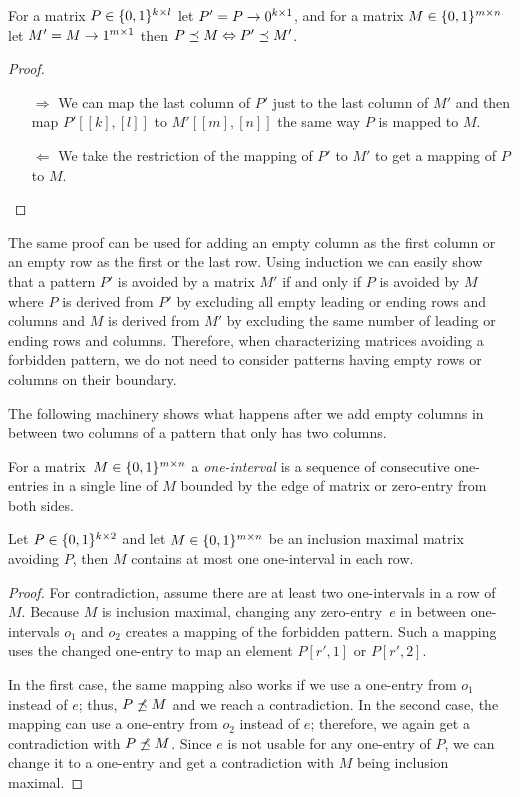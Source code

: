 \begin{obs}
\label{obs:emptyrows}
For a matrix $P\in\{0,1\}^{k\times l}$ let $P'=P\rightarrow 0^{k\times1}$, and for a matrix $M\in\{0,1\}^{m\times n}$ let $M'=M\rightarrow 1^{m\times1}$ then $P\preceq M\Leftrightarrow P'\preceq M'$.
\end{obs}
\begin{proof}
\begin{itemize}
	\item[$\Rightarrow$] We can map the last column of $P'$ just to the last column of $M'$ and then map $P'[[k],[l]]$ to $M'[[m],[n]]$ the same way $P$ is mapped to $M$.
	\item[$\Leftarrow$] We take the restriction of the mapping of $P'$ to $M'$ to get a mapping of $P$ to $M$.
\end{itemize}
\end{proof}

The same proof can be used for adding an empty column as the first column or an empty row as the first or the last row. Using induction we can easily show that a pattern $P'$ is avoided by a matrix $M'$ if and only if $P$ is avoided by $M$ where $P$ is derived from $P'$ by excluding all empty leading or ending rows and columns and $M$ is derived from $M'$ by excluding the same number of leading or ending rows and columns. Therefore, when characterizing matrices avoiding a forbidden pattern, we do not need to consider patterns having empty rows or columns on their boundary.

The following machinery shows what happens after we add empty columns in between two columns of a pattern that only has two columns.

\begin{defn}
For a matrix~$M\in\{0,1\}^{m\times n}$ a \emph{one-interval} is a sequence of consecutive one-entries in a single line of $M$ bounded by the edge of matrix or zero-entry from both sides.
\end{defn}

\begin{lemma}
\label{lemma:twocols}
Let $P\in\{0,1\}^{k\times2}$ and let $M\in\{0,1\}^{m\times n}$ be an inclusion maximal matrix avoiding $P$, then $M$ contains at most one one-interval in each row.
\end{lemma}
\begin{proof}
For contradiction, assume there are at least two one-intervals in a row of $M$. Because $M$ is inclusion maximal, changing any zero-entry~$e$ in between one-intervals $o_1$ and $o_2$ creates a mapping of the forbidden pattern. Such a mapping uses the changed one-entry to map an element $P[r',1]$ or $P[r',2]$.

In the first case, the same mapping also works if we use a one-entry from $o_1$ instead of $e$; thus, $P\not\preceq M$ and we reach a contradiction. In the second case, the mapping can use a one-entry from $o_2$ instead of $e$; therefore, we again get a contradiction with $P\not\preceq M$. Since $e$ is not usable for any one-entry of $P$, we can change it to a one-entry and get a contradiction with $M$ being inclusion maximal.
\end{proof}

